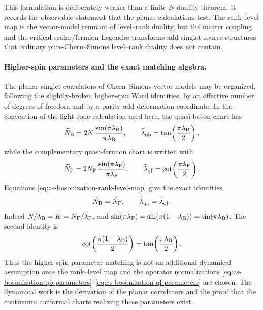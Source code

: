 \noindent
This formulation is deliberately weaker than a finite-\(N\) duality theorem.
It records the observable statement that the planar calculations test.  The rank--level
map is the vector-model remnant of level--rank duality, but the matter
coupling and the critical scalar/fermion Legendre transforms add singlet-source
structures that ordinary pure-Chern--Simons level--rank duality does not
contain.

\paragraph{Higher-spin parameters and the exact matching algebra.}
The planar singlet correlators of Chern--Simons vector models may be
organized, following the slightly-broken higher-spin Ward identities, by an
effective number of degrees of freedom and by a parity-odd deformation
coordinate.  In the convention of the light-cone calculation used here, the
quasi-boson chart has
\begin{equation}
  \widetilde N_{\rm B}
  =
  2N\,\frac{\sin(\pi\lambda_{\rm B})}{\pi\lambda_{\rm B}},
  \qquad
  \widetilde\lambda_{\rm qb}
  =
  \tan\!\left(\frac{\pi\lambda_{\rm B}}{2}\right),
  \label{eq:cs-bosonization-qb-parameters}
\end{equation}
while the complementary quasi-fermion chart is written with
\begin{equation}
  \widetilde N_{\rm F}
  =
  2N_{\rm F}\,\frac{\sin(\pi\lambda_{\rm F})}{\pi\lambda_{\rm F}},
  \qquad
  \widetilde\lambda_{\rm qf}
  =
  \cot\!\left(\frac{\pi\lambda_{\rm F}}{2}\right).
  \label{eq:cs-bosonization-qf-parameters}
\end{equation}
Equations \eqref{eq:cs-bosonization-rank-level-map} give the exact identities
\begin{equation}
  {\widetilde N_{\rm B}=\widetilde N_{\rm F}},
  \qquad
  \widetilde\lambda_{\rm qb}=\widetilde\lambda_{\rm qf}.
  \label{eq:cs-bosonization-parameter-matching}
\end{equation}
Indeed \(N/\lambda_{\rm B}=K=N_{\rm F}/\lambda_{\rm F}\), and
\(\sin(\pi\lambda_{\rm F})=\sin(\pi(1-\lambda_{\rm B}))=\sin(\pi\lambda_{\rm B})\).
The second identity is
\[
  \cot\!\left(\frac{\pi(1-\lambda_{\rm B})}{2}\right)
  =
  \tan\!\left(\frac{\pi\lambda_{\rm B}}{2}\right).
\]
Thus the higher-spin parameter matching is not an additional dynamical
assumption once the rank--level map and the operator normalizations
\eqref{eq:cs-bosonization-qb-parameters}--\eqref{eq:cs-bosonization-qf-parameters}
are chosen.  The dynamical work is the derivation of the planar correlators
and the proof that the continuum conformal charts realizing these parameters
exist.


